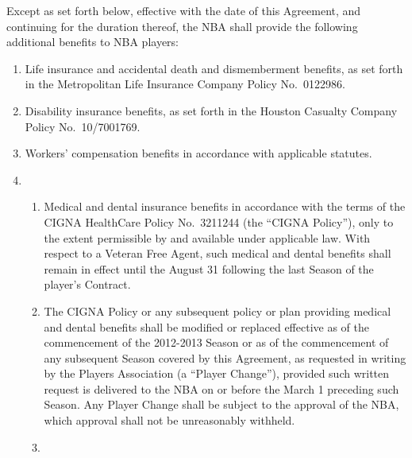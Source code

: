 \documentclass[
]{book}
\providecommand{\tightlist}{%
  \setlength{\itemsep}{0pt}\setlength{\parskip}{0pt}}
\begin{document}
Except as set forth below, effective with the date of this Agreement, and continuing for the duration thereof, the NBA shall provide the following additional benefits to NBA players:

\begin{enumerate}
\def\labelenumi{(\alph{enumi})}
\item
  Life insurance and accidental death and dismemberment benefits, as set forth in the Metropolitan Life Insurance Company Policy No.~0122986.
\item
  Disability insurance benefits, as set forth in the Houston Casualty Company Policy No.~10/7001769.
\item
  Workers' compensation benefits in accordance with applicable statutes.
\item
  \begin{enumerate}
  \def\labelenumii{(\arabic{enumii})}
  \tightlist
  \item
    Medical and dental insurance benefits in accordance with the terms of the CIGNA HealthCare Policy No.~3211244 (the ``CIGNA Policy''), only to the extent permissible by and available under applicable law. With respect to a Veteran Free Agent, such medical and dental benefits shall remain in effect until the August 31 following the last Season of the player's Contract.
  \item
    The CIGNA Policy or any subsequent policy or plan providing medical and dental benefits shall be modified or replaced effective as of the commencement of the 2012-2013 Season or as of the commencement of any subsequent Season covered by this Agreement, as requested in writing by the Players Association (a ``Player Change''), provided such written request is delivered to the NBA on or before the March 1 preceding such Season. Any Player Change shall be subject to the approval of the NBA, which approval shall not be unreasonably withheld.
  \item

\end{enumerate}
\end{enumerate}
\end{document}
